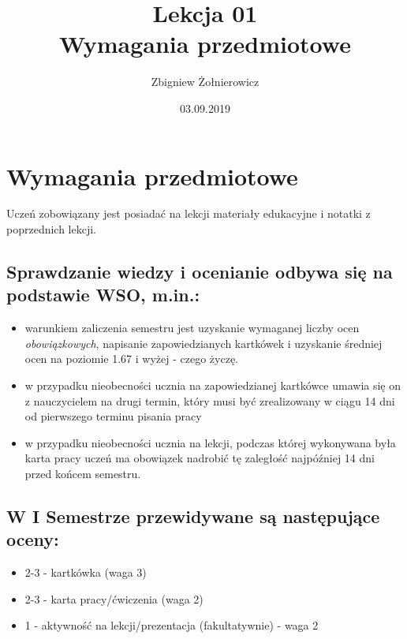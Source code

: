 \documentclass[a4paper]{article}
\begin{document}
\title{{\huge Lekcja 01} \\
{\large Wymagania przedmiotowe}}
\author{Zbigniew Żołnierowicz}
\date{03.09.2019}
\maketitle
\section{Wymagania przedmiotowe}
Uczeń zobowiązany jest posiadać na lekcji materiały edukacyjne i notatki z poprzednich lekcji.
\subsection{Sprawdzanie wiedzy i ocenianie odbywa się na podstawie WSO, m.in.:}
    \begin{itemize}
        \item warunkiem zaliczenia semestru jest uzyskanie wymaganej liczby ocen \emph{obowiązkowych},
        napisanie zapowiedzianych kartkówek i uzyskanie średniej ocen na poziomie 1.67 i wyżej - czego życzę.
        \item w przypadku nieobecności ucznia na zapowiedzianej kartkówce umawia się on z nauczycielem na drugi termin,
        który musi być zrealizowany w ciągu 14 dni od pierwszego terminu pisania pracy
        \item w przypadku nieobecności ucznia na lekcji, podczas której wykonywana była karta pracy uczeń ma obowiązek
        nadrobić tę zaległość najpóźniej 14 dni przed końcem semestru.
    \end{itemize}
\subsection{W I Semestrze przewidywane są następujące oceny:}
    \begin{itemize}
        \item 2-3 - kartkówka (waga 3)
        \item 2-3 - karta pracy/ćwiczenia (waga 2)
        \item 1 - aktywność na lekcji/prezentacja (fakultatywnie) - waga 2
    \end{itemize}
\end{document}
